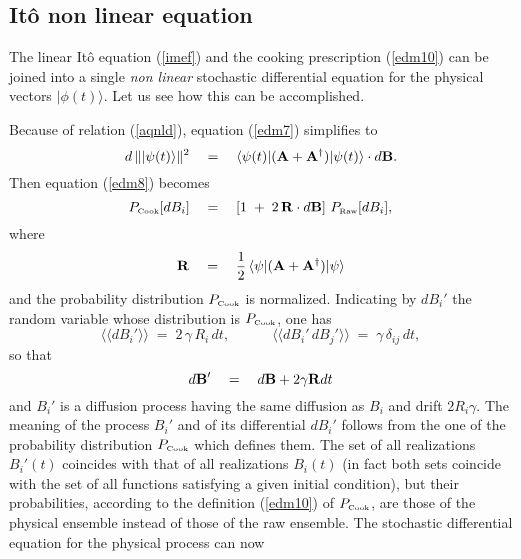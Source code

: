 \documentclass[10pt,a4paper]{article}
\newcommand{\llangle}{\langle\!\langle}
\newcommand{\rrangle}{\rangle\!\rangle}
\begin{document}
\subsection{It\^o non linear equation} \label{sec62}

The linear It\^o equation (\ref{imef}) and the cooking
prescription (\ref{edm10}) can be joined into a single {\it non
linear} stochastic differential equation for the physical vectors
$|\phi(t)\rangle$. Let us see how this can be accomplished.

Because of relation (\ref{aqnld}), equation (\ref{edm7})
simplifies to
\begin{equation} \label{mdc}
d\,\| |\psi(t)\rangle\|^{2} \quad = \quad \langle\psi(t)|({\bf A}
+ {\bf A}^{\dagger})|\psi(t) \rangle\cdot d{\bf B}.
\end{equation}
Then equation (\ref{edm8}) becomes
\begin{equation}
P_{\makebox{\tiny Cook}}[dB_{i}] \quad = \quad \left[ 1\; + \;
2\,{\bf R}\cdot d{\bf B} \right]\, P_{\makebox{\tiny
Raw}}[dB_{i}],
\end{equation}
where
\begin{equation}
{\bf R}\quad = \quad \frac{1}{2}\, \langle\psi|({\bf A} + {\bf
A}^{\dagger})|\psi \rangle
\end{equation}
and the probability distribution $P_{\makebox{\tiny Cook}}$ is
normalized. Indicating by $dB_{i}'$ the random variable whose
distribution is $P_{\makebox{\tiny Cook}}$, one has
\begin{equation}
\llangle dB_{i}' \rrangle \; = \; 2\,\gamma\,R_{i}\,dt, \qquad
\quad \llangle dB_{i}'\, dB_{j}' \rrangle \; = \;
\gamma\,\delta_{ij}\,dt,
\end{equation}
so that
\begin{equation}
d{\bf B}' \quad = \quad d{\bf B} + 2\gamma {\bf R} dt
\end{equation}
and $B_{i}'$ is a diffusion process having the same diffusion as
$B_{i}$ and drift  $2 R_{i} \gamma$. The meaning of the process
$B_{i}'$ and of its differential $d B_{i}'$ follows from the one
of the probability distribution $P_{\makebox{\tiny Cook}}$ which
defines them. The set of all realizations $B_{i}'(t)$ coincides
with that of all realizations $B_{i}(t)$ (in fact both sets
coincide with the set of all functions satisfying a given initial
condition), but their probabilities, according to the definition
(\ref{edm10}) of $P_{\makebox{\tiny Cook}}$, are those of the
physical ensemble instead of those of the raw ensemble. The
stochastic differential equation for the physical process can now
\end{document}
